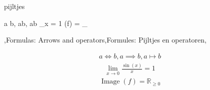\DeclareMathOperator{\Image}{Image}

\begin{saveblock}{pijltjes}
	\begin{highlightblock}[gobble=8]
		\DeclareMathOperator{\Image}{Image}

		a \iff b, a\implies b, a\mapsto b
		\lim_{x} = 1
		\Image(f) = _{}
	\end{highlightblock}
\end{saveblock}


\begin{frame}
	{\lang,Formulas: Arrows and operators,Formules: Pijltjes en operatoren,}


	\vspace{-10pt}
	\begin{align*}
		a \iff b, a\implies b, a\mapsto b
	\end{align*}
	\begin{align*}
		\lim_{x\to 0}\frac{\sin(x)}{x} = 1
	\end{align*}
	\begin{align*}
		\Image(f) = \mathbb{R}_{\geq 0}
	\end{align*}
\end{frame}
